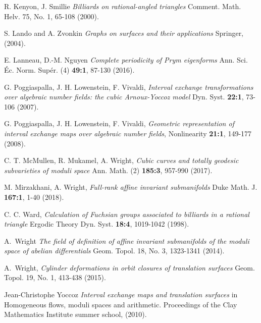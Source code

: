 \documentclass[a4paper,12pt]{article}
\begin{document}
\begin{thebibliography}{sage-flatsurf}
R. Kenyon, J. Smillie
\textit{Billiards on rational-angled triangles}
Comment. Math. Helv. 75, No. 1, 65-108 (2000).

S. Lando and A. Zvonkin
\textit{Graphs on surfaces and their applications}
Springer, (2004).

E. Lanneau, D.-M. Nguyen
\textit{Complete periodicity of Prym eigenforms}
Ann. Sci. Éc. Norm. Supér. (4) \textbf{49:1}, 87-130 (2016).

G. Poggiaspalla, J. H. Lowenstein, F. Vivaldi,
\textit{Interval exchange transformations over algebraic number fields: the cubic Arnoux-Yoccoz model}
Dyn. Syst. \textbf{22:1}, 73-106 (2007).

G. Poggiaspalla, J. H. Lowenstein, F. Vivaldi,
\textit{Geometric representation of interval exchange maps over algebraic number fields},
Nonlinearity \textbf{21:1}, 149-177 (2008).

C. T. McMullen, R. Mukamel, A. Wright,
\textit{Cubic curves and totally geodesic subvarieties of moduli space}
Ann. Math. (2) \textbf{185:3}, 957-990 (2017).

M. Mirzakhani, A. Wright,
\textit{Full-rank affine invariant submanifolds}
Duke Math. J. \textbf{167:1}, 1-40 (2018).

C. C. Ward,
\textit{Calculation of Fuchsian groups associated to billiards in a rational triangle}
Ergodic Theory Dyn. Syst. \textbf{18:4}, 1019-1042 (1998).

A.~Wright
\textit{The field of definition of affine invariant submanifolds of the moduli space of abelian differentials}
Geom. Topol. 18, No. 3, 1323-1341 (2014).

A.~Wright,
\textit{Cylinder deformations in orbit closures of translation surfaces}
Geom. Topol. 19, No. 1, 413-438 (2015).

Jean-Christophe Yoccoz
\textit{Interval exchange maps and translation surfaces}
in Homogeneous flows, moduli spaces and arithmetic.
Proceedings of the Clay Mathematics Institute summer school,
(2010).
\end{thebibliography}
\end{document}
